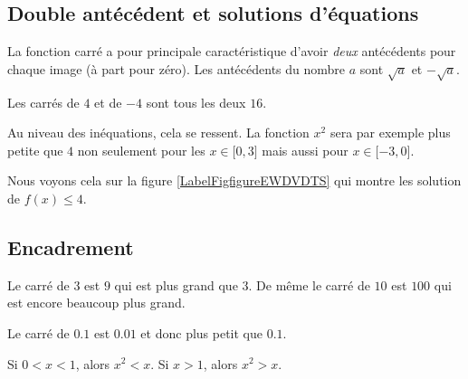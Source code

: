     \subsection{Double antécédent et solutions d'équations}

\begin{Aretenir}
    La fonction carré a pour principale caractéristique d'avoir \emph{deux} antécédents pour chaque image (à part pour zéro). Les antécédents du nombre \( a\) sont \( \sqrt{a}\) et \( -\sqrt{a}\).
\end{Aretenir}

\begin{example}
    Les carrés de \( 4\) et de \( -4\) sont tous les deux \( 16\).
\end{example}

Au niveau des inéquations, cela se ressent. La fonction \( x^2\) sera par exemple plus petite que \( 4\) non seulement pour les \( x\in\mathopen[ 0 , 3 \mathclose]\) mais aussi pour \( x\in\mathopen[ -3 , 0 \mathclose]\).

Nous voyons cela sur la figure \ref{LabelFigfigureEWDVDTS} qui montre les solution de \( f(x)\leq 4\). %
\newcommand{\CaptionFigfigureEWDVDTS}{La résulution graphique d'une inéquation avec la fonction carré.}



\subsection{Encadrement}

\begin{example}
    Le carré de \( 3\) est \( 9\) qui est plus grand que \( 3\). De même le carré de \( 10\) est \( 100\) qui est encore beaucoup plus grand.

    Le carré de \( 0.1\) est \( 0.01\) et donc plus petit que \( 0.1\).
\end{example}


\begin{Aretenir}
    Si \( 0<x<1\), alors \( x^2<x\). Si \( x>1\), alors \( x^2>x\).
\end{Aretenir}


